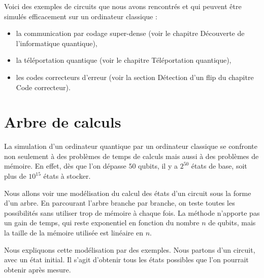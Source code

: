 \documentclass[11pt,class=report,crop=false]{standalone}
\begin{document}
\bigskip

Voici des exemples de circuits que nous avons rencontrés et qui peuvent être simulés efficacement sur un ordinateur classique :
\begin{itemize}
  \item la communication par codage super-dense (voir le chapitre \og{}Découverte de l'informatique quantique\fg{}),

  \item la téléportation quantique (voir le chapitre \og{}Téléportation quantique\fg{}),

  \item les codes correcteurs d'erreur (voir la section \og{}Détection d'un flip\fg{} du chapitre \og{}Code correcteur\fg{}).
\end{itemize}



\section{Arbre de calculs}

La simulation d'un ordinateur quantique par un ordinateur classique se confronte non seulement à des problèmes de temps de calculs mais aussi à des problèmes de mémoire. En effet, dès que l'on dépasse $50$ qubits, il y a $2^{50}$ états de base, soit plus de $10^{15}$ états à stocker.

Nous allons voir une modélisation du calcul des états d'un circuit sous la forme d'un arbre. 
En parcourant l'arbre branche par branche, on teste toutes les possibilités sans utiliser trop de mémoire à chaque fois. La méthode n'apporte pas un gain de temps, qui reste exponentiel en fonction du nombre $n$ de qubits, mais la taille de la mémoire utilisée est linéaire en $n$.

\medskip

Nous expliquons cette modélisation par des exemples.
Nous partons d'un circuit, avec un état initial. Il s'agit d'obtenir tous les états possibles que l'on pourrait obtenir après mesure.
\end{document}
